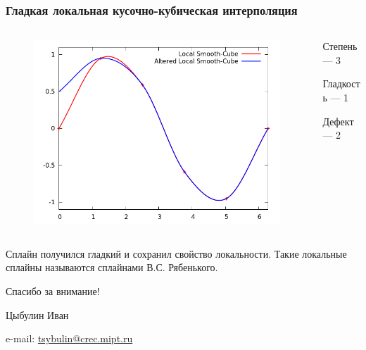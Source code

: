 \documentclass[aspectratio=169,unicode]{beamer}
\newcommand{\colorhref}[2]{\href{#1}{\textcolor{miptbase!30!black}{#2}}}
\begin{document}
\begin{frame}
\frametitle{Гладкая локальная кусочно-кубическая интерполяция}
	\begin{columns}[c]
	\begin{column}{0.6\textwidth}
	\begin{figure}
	\center
	\includegraphics[height=.7\textheight]{spline3_1.png}%
	\end{figure}
	\end{column}
	\begin{column}{0.4\textwidth}
	Степень --- 3

	Гладкость --- 1

	Дефект --- 2
	\end{column}
	\end{columns}

	Сплайн получился гладкий и сохранил свойство локальности. Такие локальные сплайны называются сплайнами В.С. Рябенького.
\end{frame}

\begin{frame}[plain]
  \begin{center}
  {\Huge Спасибо за внимание!}
  \vspace{8ex}

  Цыбулин Иван

  e-mail: \colorhref{mailto:tsybulin@crec.mipt.ru}{tsybulin@crec.mipt.ru}
  \end{center}
\end{frame}
\end{document}
